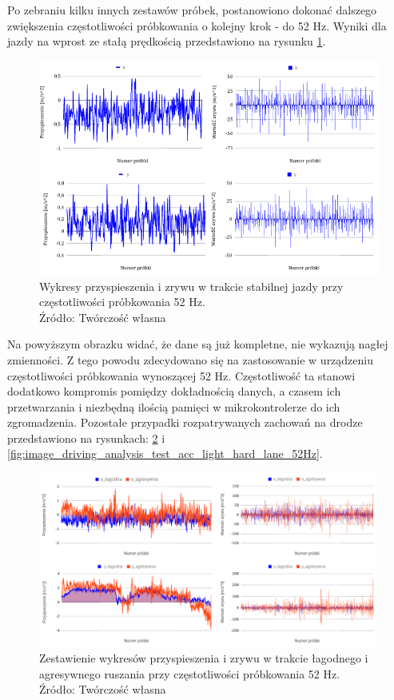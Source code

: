 Po zebraniu kilku innych zestawów próbek, postanowiono dokonać dalszego zwiększenia częstotliwości próbkowania o kolejny krok - do 52 Hz. Wyniki dla jazdy na wprost ze stałą prędkością przedstawiono na rysunku \ref{fig:image_driving_analysis_test_52Hz}.

\begin{figure}[H]
	\centering
	\includegraphics[width=15cm]{img/driving_analysis/stabilna_52.png}
	\caption{Wykresy przyspieszenia i zrywu w trakcie stabilnej jazdy przy częstotliwości próbkowania 52 Hz.
	\\Źródło: Twórczość własna}
	\label{fig:image_driving_analysis_test_52Hz}
\end{figure}

Na powyższym obrazku widać, że dane są już kompletne, nie wykazują nagłej zmienności. Z tego powodu zdecydowano się na zastosowanie w urządzeniu częstotliwości próbkowania wynoszącej 52 Hz. Częstotliwość ta stanowi dodatkowo kompromis pomiędzy dokładnością danych, a czasem ich przetwarzania i niezbędną ilością pamięci w mikrokontrolerze do ich zgromadzenia. Pozostałe przypadki rozpatrywanych zachowań na drodze przedstawiono na rysunkach: \ref{fig:image_driving_analysis_test_acc_light_aggressive_52Hz} i \ref{fig:image_driving_analysis_test_acc_light_hard_lane_52Hz}.

\begin{figure}[H]
	\centering
	\includegraphics[width=16cm]{img/driving_analysis/zestawienie_lagodna_ostra-ruszanie.png}
	\caption{Zestawienie wykresów przyspieszenia i zrywu w trakcie łagodnego i agresywnego ruszania przy częstotliwości próbkowania 52 Hz.
	\\Źródło: Twórczość własna}
	\label{fig:image_driving_analysis_test_acc_light_aggressive_52Hz}
\end{figure}


